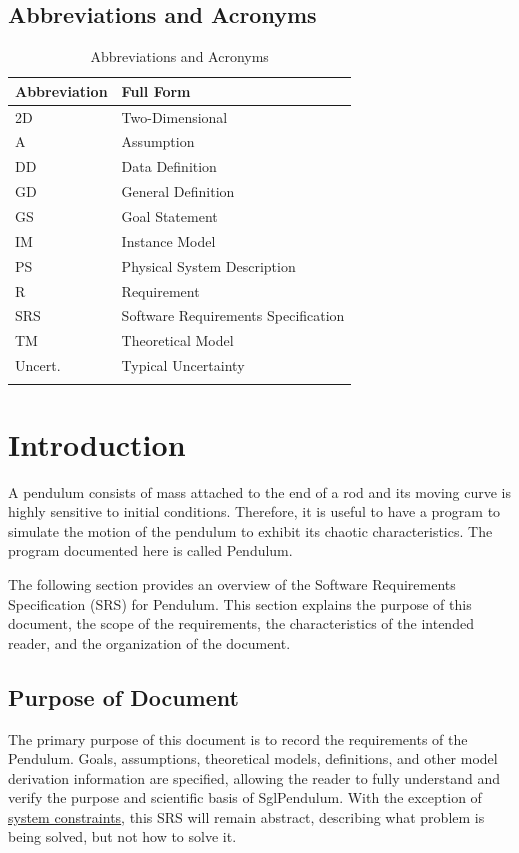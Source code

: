 \documentclass[12pt]{article}
\begin{document}
\subsection{Abbreviations and Acronyms}
\label{Sec:TAbbAcc}
\begin{longtable}{l l}
\toprule
\textbf{Abbreviation} & \textbf{Full Form}
\\
\midrule
\endhead
2D & Two-Dimensional
\\
A & Assumption
\\
DD & Data Definition
\\
GD & General Definition
\\
GS & Goal Statement
\\
IM & Instance Model
\\
PS & Physical System Description
\\
R & Requirement
\\
SRS & Software Requirements Specification
\\
TM & Theoretical Model
\\
Uncert. & Typical Uncertainty
\\
\bottomrule
\caption{Abbreviations and Acronyms}
\label{Table:TAbbAcc}
\end{longtable}
\section{Introduction}
\label{Sec:Intro}
A pendulum consists of mass attached to the end of a rod and its moving curve is highly sensitive to initial conditions. Therefore, it is useful to have a program to simulate the motion of the pendulum to exhibit its chaotic characteristics. The program documented here is called Pendulum.

The following section provides an overview of the Software Requirements Specification (SRS) for Pendulum. This section explains the purpose of this document, the scope of the requirements, the characteristics of the intended reader, and the organization of the document.

\subsection{Purpose of Document}
\label{Sec:DocPurpose}
The primary purpose of this document is to record the requirements of the Pendulum. Goals, assumptions, theoretical models, definitions, and other model derivation information are specified, allowing the reader to fully understand and verify the purpose and scientific basis of SglPendulum. With the exception of \hyperref[Sec:SysConstraints]{system constraints}, this SRS will remain abstract, describing what problem is being solved, but not how to solve it.
\end{document}
